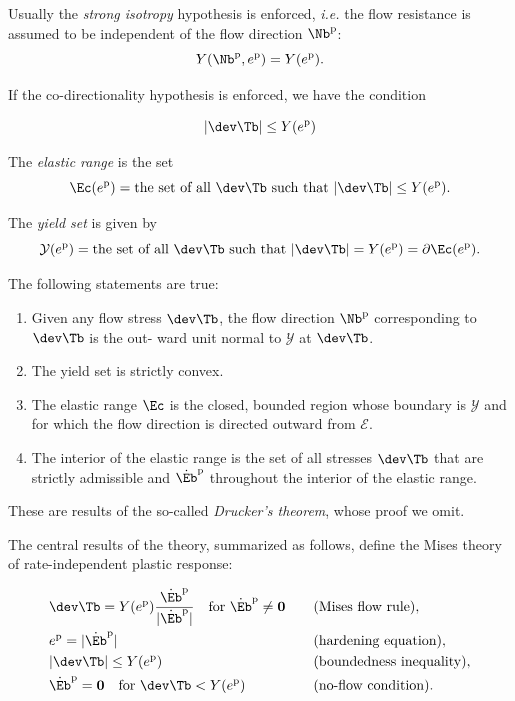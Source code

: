 Usually the \textit{strong isotropy} hypothesis is enforced, \textit{i.e.} the flow resistance is assumed to be independent of the flow direction $\Nb^{\rm p}$:
\begin{equation}
Y(\Nb^{\rm p}, e^{\rm p}) =Y(e^{\rm p}).
\end{equation}

If the co-directionality hypothesis is enforced, we have the condition
\begin{definition}
	\begin{equation}
	|\dev\Tb|\leq Y(e^{\rm p})
\end{equation}
\end{definition}

The \textit{elastic range} is the set
\begin{equation}
\Ec(e^{\rm p})=\textrm{the set of all $\dev\Tb$ such that $|\dev\Tb|\leq Y(e^{\rm p})$}.
\end{equation}

The \textit{yield set}  is given by
\begin{equation}
\mathcal{Y}(e^{\rm p})=\textrm{the set of all $\dev\Tb$ such that $|\dev\Tb|= Y(e^{\rm p})$}=\partial\Ec(e^{\rm p}).
\end{equation}

The following statements are true:
\begin{enumerate}
	\item Given any flow stress $\dev\Tb$, the flow direction $\Nb^{\rm p}$ corresponding to $\dev\Tb$ is the out-
	ward unit normal to $\mathcal{Y}$ at $\dev\Tb$.
	\item The yield set is strictly convex.
	\item The elastic range $\Ec$ is the closed, bounded region whose boundary is $\mathcal{Y}$ and for
	which the flow direction is directed outward from $\mathcal{E}$.
	\item The interior of the elastic range is the set of all stresses $\dev\Tb$ that are strictly admissible  and	
	$	\dot{\Eb}^{\rm p}$  throughout the interior of the elastic range.
	\end{enumerate}
These are results of the so-called \textit{Drucker's theorem}, whose proof we omit.

The central results of the theory, summarized as follows, define the Mises theory of rate-independent plastic response:
\begin{definition}
\begin{equation}\label{Mis}
\begin{aligned}
&\dev \Tb=Y(e^{\rm p})\frac{\dot{\Eb}^{\rm p} }{|\dot{\Eb}^{\rm p}|}\quad \textrm{for $\dot{\Eb}^{\rm p}\neq \mathbf{0}$} \quad&& \textrm{(Mises flow rule)},\\
&e^{\rm p}=|\dot{\Eb}^{\rm p}| \quad && \textrm{(hardening equation)},\\
&|\dev \Tb|\leq Y(e^{\rm p}) && \textrm{(boundedness inequality)},\\
&\dot{\Eb}^{\rm p}=\mathbf{0} \quad \textrm{for $\dev\Tb<Y(e^{\rm p})$} &&  \textrm{(no-flow condition)}.\\
\end{aligned}
\end{equation}
\end{definition}


